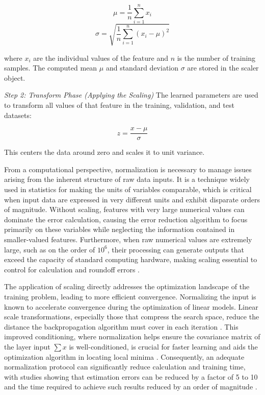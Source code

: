 {\begin{equation}
	\mu = \frac{1}{n} \sum_{i=1}^{n} x_i
\end{equation}
\begin{equation}
	\sigma = \sqrt{\frac{1}{n} \sum_{i=1}^{n} (x_i - \mu)^2}
\end{equation}

where \(x_i\) are the individual values of the feature and \(n\) is the number of training samples. The computed mean \(\mu\) and standard deviation \(\sigma\) are stored in the scaler object.

\textit{Step 2: Transform Phase (Applying the Scaling)}
The learned parameters are used to transform all values of that feature in the training, validation, and test datasets:

\begin{equation}
	z = \frac{x - \mu}{\sigma}
\end{equation}

This centers the data around zero and scales it to unit variance.

From a computational perspective, normalization is necessary to manage issues arising from the inherent structure of raw data inputs. It is a technique widely used in statistics for making the units of variables comparable, which is critical when input data are expressed in very different units and exhibit disparate orders of magnitude. Without scaling, features with very large numerical values can dominate the error calculation, causing the error reduction algorithm to focus primarily on these variables while neglecting the information contained in smaller-valued features. Furthermore, when raw numerical values are extremely large, such as on the order of $10^{6}$, their processing can generate outputs that exceed the capacity of standard computing hardware, making scaling essential to control for calculation and roundoff errors \parencite{shanker1996effectdatastandardization}.

The application of scaling directly addresses the optimization landscape of the training problem, leading to more efficient convergence. Normalizing the input is known to accelerate convergence during the optimization of linear models. Linear scale transformations, especially those that compress the search space, reduce the distance the backpropagation algorithm must cover in each iteration \parencite{sola1997importancedatanormalization}. This improved conditioning, where normalization helps ensure the covariance matrix of the layer input $\sum{}x$ is well-conditioned, is crucial for faster learning and aids the optimization algorithm in locating local minima \parencite{huang2020normalizationtechniquestrainingdnns}. Consequently, an adequate normalization protocol can significantly reduce calculation and training time, with studies showing that estimation errors can be reduced by a factor of 5 to 10 and the time required to achieve such results reduced by an order of magnitude \parencite{sola1997importancedatanormalization}.

}
